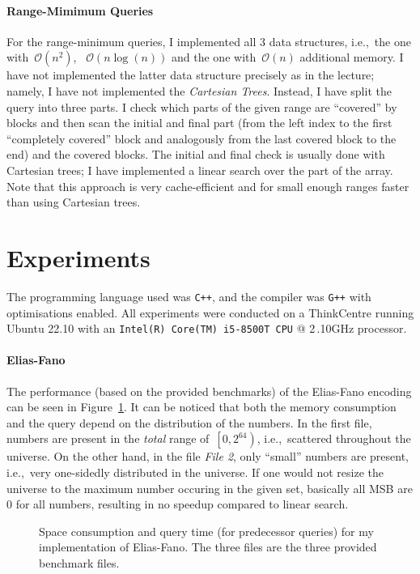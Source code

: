 \documentclass[a4paper,UKenglish,cleveref, autoref, thm-restate]{lipics-v2021}
\newcommand{\codestyling}[1]{\texttt{#1}}
\newcommand{\ie}{i.e.,\xspace~}
\begin{document}
	\paragraph*{Range-Mimimum Queries}
	For the range-minimum queries, I implemented all 3 data structures, \ie the one with~$\mathcal{O}\left(n^2\right)$, ~$\mathcal{O}\left(n \log\left(n\right)\right)$ and the one with~$\mathcal{O}\left(n\right)$ additional memory. I have not implemented the latter data structure precisely as in the lecture; namely, I have not implemented the \textit{Cartesian Trees}. Instead, I have split the query into three parts. I check which parts of the given range are ``covered'' by blocks and then scan the initial and final part (from the left index to the first ``completely covered'' block and analogously from the last covered block to the end) and the covered blocks. The initial and final check is usually done with Cartesian trees; I have implemented a linear search over the part of the array. Note that this approach is very cache-efficient and for small enough ranges faster than using Cartesian trees.
	
	\section{Experiments}
	The programming language used was \codestyling{C++}, and the compiler was \codestyling{G++} with optimisations enabled. All experiments were conducted on a ThinkCentre running Ubuntu 22.10 with an \codestyling{Intel(R) Core(TM) i5-8500T CPU} @ 2\,.10GHz processor.
	\paragraph*{Elias-Fano}
	The performance (based on the provided benchmarks) of the Elias-Fano encoding can be seen in Figure~\ref{fig:ef}. It can be noticed that both the memory consumption and the query depend on the distribution of the numbers. In the first file,  numbers are present in the \textit{total} range of~$\left[0, 2^{64}\right)$, \ie scattered throughout the universe. On the other hand, in the file \textit{File 2}, only ``small'' numbers are present, \ie very one-sidedly distributed in the universe. If one would not resize the universe to the maximum number occuring in the given set, basically all MSB are 0 for all numbers, resulting in no speedup compared to linear search.
	\begin{figure}[htbp]
		\begin{center}
			\resizebox{.9\linewidth}{!}{
				
			}
			\caption{Space consumption and query time (for  predecessor queries) for my implementation of Elias-Fano. The three files are the three provided benchmark files.}
			\label{fig:ef}
		\end{center}
	\end{figure}
\end{document}
